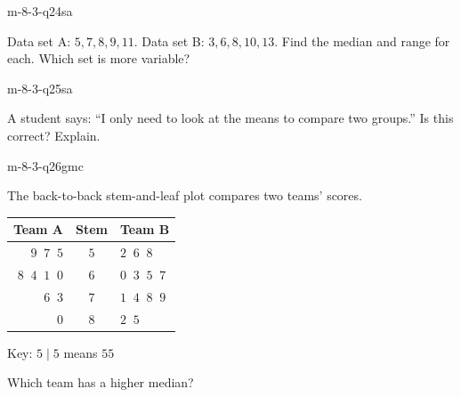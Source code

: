 \begin{practiceQuestion}{m-8-3-q24}{sa}
\begin{questionText}
Data set A: $5, 7, 8, 9, 11$. Data set B: $3, 6, 8, 10, 13$. Find the median and range for each. Which set is more variable?
\end{questionText}
\end{practiceQuestion}

\begin{practiceQuestion}{m-8-3-q25}{sa}
\begin{questionText}
A student says: ``I only need to look at the means to compare two groups.'' Is this correct? Explain.
\end{questionText}
\end{practiceQuestion}


\begin{practiceQuestion}{m-8-3-q26}{gmc}
\begin{questionText}
The back-to-back stem-and-leaf plot compares two teams' scores.

\begin{center}
\begin{tabular}{r|c|l}
\textbf{Team A} & \textbf{Stem} & \textbf{Team B} \\
\hline
$9\;\;7\;\;5$ & $5$ & $2\;\;6\;\;8$ \\
$8\;\;4\;\;1\;\;0$ & $6$ & $0\;\;3\;\;5\;\;7$ \\
$6\;\;3$ & $7$ & $1\;\;4\;\;8\;\;9$ \\
$0$ & $8$ & $2\;\;5$
\end{tabular}

Key: $5 \mid 5$ means $55$
\end{center}

Which team has a higher median?
\end{questionText}
\end{practiceQuestion}

